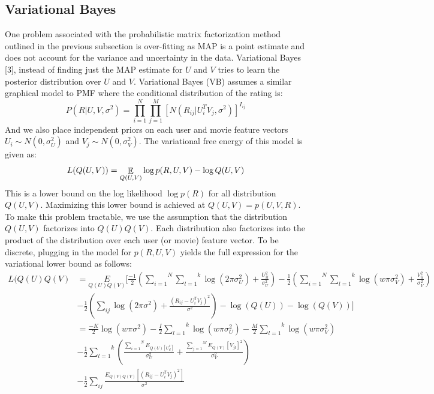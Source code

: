 \documentclass[journal,onecolumn]{IEEEtran}
\DeclareMathOperator{\E}{\mathbb{E}}
\begin{document}
\subsection{Variational Bayes}
One problem associated with the probabilistic matrix factorization method outlined in the previous subsection is over-fitting as MAP is a point estimate and does not account for the variance and uncertainty in the data. Variational Bayes [3], instead of finding just the MAP estimate for $ U $ and $ V $ tries to learn the posterior distribution over $ U $ and $ V $. Variational Bayes (VB) assumes a similar graphical model to PMF where the conditional distribution of the rating is:
\begin{equation*}
P(R | U, V, \sigma^2) = \overset{N}{\underset{i=1}{\prod}}\overset{M}{\underset{j=1}{\prod}}[N(R_{ij} | U_i^TV_j, \sigma^2)]^{I_{ij}}
\end{equation*}
And we also place independent priors on each user and movie feature vectors $ U_i \sim N(0, \sigma_U^2) $ and $ V_j \sim N(0, \sigma_V^2) $. The variational free energy of this model is given as:
\begin{equation}
	L(Q(U, V)) = \E_{Q(U,V)}\log p(R, U, V)-\log Q(U,V)\\
\end{equation}
This is a lower bound on the log likelihood $ \log p(R) $ for all distribution $ Q(U,V) $. Maximizing this lower bound is achieved at $ Q(U,V) = p(U,V,R) $. To make this problem tractable, we use the assumption that the distribution $ Q(U,V) $ factorizes into $ Q(U)Q(V) $. Each distribution also factorizes into the product of the distribution over each user (or movie) feature vector. To be discrete, plugging in the model for $ p(R,U,V) $ yields the full expression for the variational lower bound as follows:
\begin{equation*}
\begin{split}
	L(Q(U)Q(V) &= \underset{Q(U)Q(V)}{E}[\frac{-1}{2}(\overset{N}{\underset{i=1}{\sum}}\overset{k}{\underset{l=1}{\sum}}\log(2\pi\sigma_U^2) + \frac{U_{il}^2}{\sigma_U^2}) - \frac{1}{2}(\overset{N}{\underset{i=1}{\sum}}\overset{k}{\underset{l=1}{\sum}} \log(w\pi\sigma_V^2) + \frac{V_{il}^2}{\sigma_V^2}) \\ &-\frac{1}{2}(\underset{ij}{\sum}\log(2\pi \sigma^2) + \frac{(R_{ij}-U_i^TV_j)^2}{\sigma^2} ) - \log(Q(U)) -\log(Q(V))]\\
	&= \frac{-K}{2}\log(w\pi\sigma^2)-\frac{I}{2}\overset{k}{\underset{l=1}{\sum}}\log(w\pi\sigma_U^2)-\frac{M}{2}\overset{k}{\underset{l=1}{\sum}}\log(w\pi\sigma_V^2)\\
	&-\frac{1}{2}\overset{k}{\underset{l=1}{\sum}}( \frac{\overset{N}{\underset{i=1}{\sum}}E_{Q(U)[U_{il}^2] } }{\sigma_U^2} +\frac{\overset{M}{\underset{j=1}{\sum}} E_{Q(V)}[V_{jl}]^2 }{\sigma_V^2} )\\
	&-\frac{1}{2}\underset{ij}{\sum} \frac{E_{Q(V)Q(V)}[(R_{ij}-U_i^TV_j)^2]}{\sigma^2}
\end{split}
\end{equation*}
\end{document}
